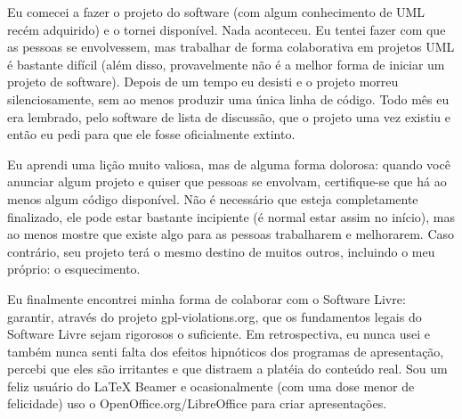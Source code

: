 Eu comecei a fazer o projeto do software (com algum conhecimento de UML recém adquirido)
e o tornei disponível. Nada aconteceu. Eu tentei fazer com que as pessoas se envolvessem,
mas trabalhar de forma colaborativa em projetos UML é bastante difícil (além disso,
provavelmente não é a melhor forma de iniciar um projeto de software). Depois de um
tempo eu desisti e o projeto morreu silenciosamente, sem ao menos produzir uma única
linha de código. Todo mês eu era lembrado, pelo software de lista de discussão, que
o projeto uma vez existiu e então eu pedi para que ele fosse oficialmente extinto.

Eu aprendi uma lição muito valiosa, mas de alguma forma dolorosa: quando você
anunciar algum projeto e quiser que pessoas se envolvam, certifique-se que há
ao menos algum código disponível. Não é necessário que esteja completamente finalizado,
ele pode estar bastante incipiente (é normal estar assim no início), mas ao menos
mostre que existe algo para as pessoas trabalharem e melhorarem. Caso contrário, seu
projeto terá o mesmo destino de muitos outros, incluindo o meu próprio: o esquecimento.

Eu finalmente encontrei minha forma de colaborar com o Software Livre: garantir, através
do projeto gpl-violations.org, que os fundamentos legais do Software Livre sejam rigorosos
o suficiente. Em retrospectiva, eu nunca usei e também nunca senti falta dos efeitos
hipnóticos dos programas de apresentação, percebi que eles são irritantes e que distraem
a platéia do conteúdo real. Sou um feliz usuário do LaTeX Beamer e ocasionalmente (com
uma dose menor de felicidade) uso o OpenOffice.org/LibreOffice para criar apresentações.
